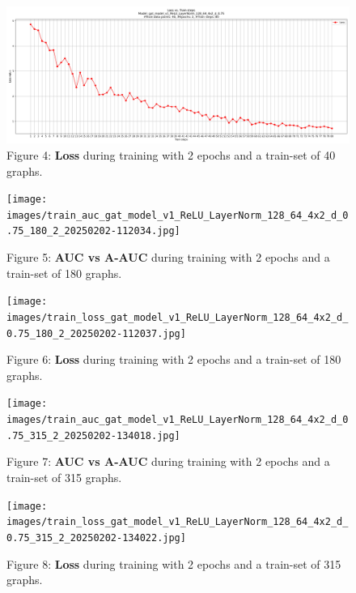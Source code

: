 \documentclass[11pt]{article}
\begin{document}
	\begin{figure}[h!] %
		\centering
		\label{figure_4}
		\includegraphics[width=1\textwidth]{images/train_loss_gat_model_v1_ReLU_LayerNorm_128_64_4x2_d_0.75_40_2_20250202-144007.jpg}
		\caption{Figure 4: \textbf{Loss} during training with 2 epochs and a train-set of 40 graphs.}
	\end{figure}
	
	\begin{figure}[h!] %
		\centering
		\label{figure_5}
		\texttt{[image: images/train\_auc\_gat\_model\_v1\_ReLU\_LayerNorm\_128\_64\_4x2\_d\_0.75\_180\_2\_20250202-112034.jpg]}
		\caption{Figure 5: \textbf{AUC vs A-AUC} during training with 2 epochs and a train-set of 180 graphs.}
	\end{figure}
	
	\begin{figure}[h!] %
		\centering
		\label{figure_6}
		\texttt{[image: images/train\_loss\_gat\_model\_v1\_ReLU\_LayerNorm\_128\_64\_4x2\_d\_0.75\_180\_2\_20250202-112037.jpg]}
		\caption{Figure 6: \textbf{Loss} during training with 2 epochs and a train-set of 180 graphs.}
	\end{figure}
	
	\begin{figure}[h!] %
		\centering
		\label{figure_7}
		\texttt{[image: images/train\_auc\_gat\_model\_v1\_ReLU\_LayerNorm\_128\_64\_4x2\_d\_0.75\_315\_2\_20250202-134018.jpg]}
		\caption{Figure 7: \textbf{AUC vs A-AUC} during training with 2 epochs and a train-set of 315 graphs.}
	\end{figure}
	
	\begin{figure}[h!] %
		\centering
		\label{figure_8}
		\texttt{[image: images/train\_loss\_gat\_model\_v1\_ReLU\_LayerNorm\_128\_64\_4x2\_d\_0.75\_315\_2\_20250202-134022.jpg]}
		\caption{Figure 8: \textbf{Loss} during training with 2 epochs and a train-set of 315 graphs.}
	\end{figure}
	
\end{document}
